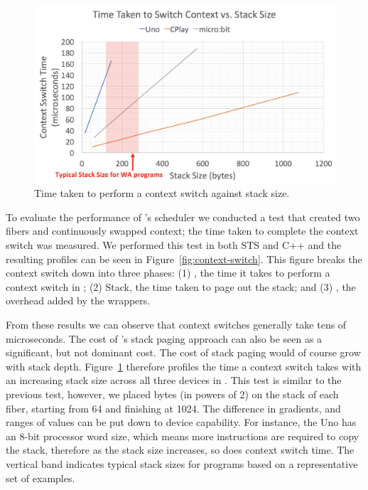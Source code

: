 \begin{figure}[ht]
    \includegraphics[width=.99\columnwidth]{images/context-vs-stack.png}
\caption{\label{fig:context-vs-stack}Time taken to perform a context switch against stack size.}
\end{figure}

To evaluate the performance of \CON's scheduler we conducted a test that created two fibers and continuously swapped context; the time taken to complete the context switch was measured.
We performed this test in both STS and C++ and the resulting profiles can be seen in Figure~\ref{fig:context-switch}.
This figure breaks the context switch down into three phases:
(1) \CO, the time it takes to perform a context switch in \CO;
(2) Stack, the time taken to page out the \MC stack; and
(3) \MC, the overhead added by the \MC wrappers.

From these results we can observe that context switches generally take tens of microseconds.
The cost of \CON's stack paging approach can also be seen as a significant, but not dominant cost.
The cost of stack paging would of course grow with stack depth.
Figure~\ref{fig:context-vs-stack} therefore profiles the time a context switch takes with an increasing stack size across all three devices in \CO.
This test is similar to the previous test, however, we placed bytes (in powers of 2) on the stack of each fiber, starting from 64 and finishing at 1024.
The difference in gradients, and ranges of values can be put down to device capability.
For instance, the Uno has an 8-bit processor word size, which means more instructions are required to copy the stack, therefore as the stack size increases, so does context switch time.
The vertical band indicates typical stack sizes for \MC programs based on a representative set of examples.


